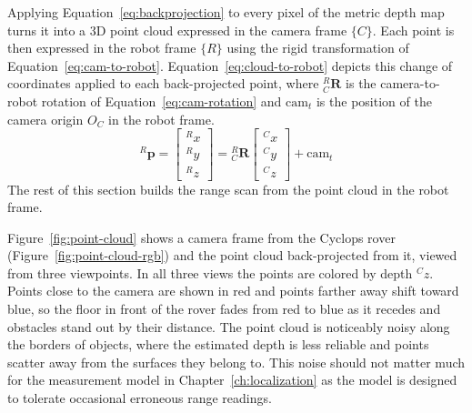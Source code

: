 Applying Equation~\ref{eq:backprojection} to every pixel of the metric depth map turns it into a
3D point cloud expressed in the camera frame $\{C\}$. Each point is then expressed in the robot
frame $\{R\}$ using the rigid
transformation of Equation~\ref{eq:cam-to-robot}. Equation~\ref{eq:cloud-to-robot} depicts
this change of coordinates applied to each back-projected point, where ${}^{R}_{C}\mathbf{R}$ is
the camera-to-robot rotation of Equation~\ref{eq:cam-rotation} and $\mathrm{cam}_t$ is the
position of the camera origin $O_C$ in the robot frame.
\begin{equation}
  {}^{R}\mathbf{p} =
  \begin{bmatrix} {}^{R}x \\ {}^{R}y \\ {}^{R}z \end{bmatrix}
  = {}^{R}_{C}\mathbf{R}
  \begin{bmatrix} {}^{C}x \\ {}^{C}y \\ {}^{C}z \end{bmatrix}
  + \mathrm{cam}_t
  \label{eq:cloud-to-robot}
\end{equation}
The rest of this
section builds the range scan from the point cloud in the robot frame.

Figure~\ref{fig:point-cloud} shows a camera frame from the Cyclops rover
(Figure~\ref{fig:point-cloud-rgb}) and the point cloud back-projected from it, viewed from three
viewpoints. In all three views the points are colored by
depth ${}^{C}z$. Points close to the camera are shown in red and points farther away shift
toward blue, so the floor in front of the rover fades from red to blue as it recedes and obstacles
stand out by their distance. The point cloud is noticeably noisy
along the borders of objects, where the estimated depth is less reliable and points scatter away from the
surfaces they belong to. This noise should not matter much for the measurement model in
Chapter~\ref{ch:localization} as the model is designed to tolerate occasional erroneous range readings.

